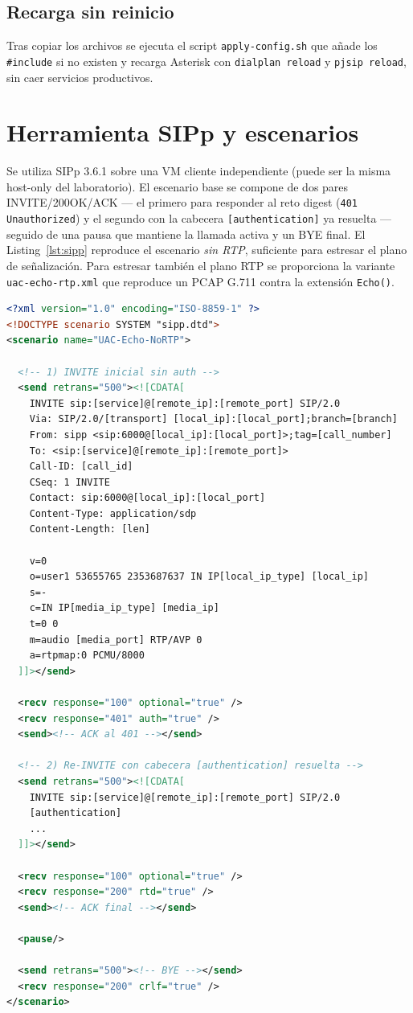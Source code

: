 \documentclass[conference]{IEEEtran}
\begin{document}
\subsection{Recarga sin reinicio}

Tras copiar los archivos se ejecuta el script
\texttt{apply-config.sh} que a\~nade los \texttt{\#include} si no
existen y recarga Asterisk con \texttt{dialplan reload} y
\texttt{pjsip reload}, sin caer servicios productivos.

\section{Herramienta SIPp y escenarios}

Se utiliza SIPp 3.6.1 \cite{ref_sipp} sobre una VM cliente
independiente (puede ser la misma host-only del laboratorio). El
escenario base se compone de dos pares INVITE/200OK/ACK --- el primero
para responder al reto digest (\texttt{401 Unauthorized}) y el segundo
con la cabecera \texttt{[authentication]} ya resuelta --- seguido de
una pausa que mantiene la llamada activa y un BYE final. El
Listing~\ref{lst:sipp} reproduce el escenario \textit{sin RTP},
suficiente para estresar el plano de se\~nalizaci\'on. Para estresar
tambi\'en el plano RTP se proporciona la variante
\texttt{uac-echo-rtp.xml} que reproduce un PCAP G.711 contra la
extensi\'on \texttt{Echo()}.

\begin{lstlisting}[language=XML,caption={\texttt{uac-echo-no-rtp.xml}: escenario UAC con digest (esqueleto).},label=lst:sipp]
<?xml version="1.0" encoding="ISO-8859-1" ?>
<!DOCTYPE scenario SYSTEM "sipp.dtd">
<scenario name="UAC-Echo-NoRTP">

  <!-- 1) INVITE inicial sin auth -->
  <send retrans="500"><![CDATA[
    INVITE sip:[service]@[remote_ip]:[remote_port] SIP/2.0
    Via: SIP/2.0/[transport] [local_ip]:[local_port];branch=[branch]
    From: sipp <sip:6000@[local_ip]:[local_port]>;tag=[call_number]
    To: <sip:[service]@[remote_ip]:[remote_port]>
    Call-ID: [call_id]
    CSeq: 1 INVITE
    Contact: sip:6000@[local_ip]:[local_port]
    Content-Type: application/sdp
    Content-Length: [len]

    v=0
    o=user1 53655765 2353687637 IN IP[local_ip_type] [local_ip]
    s=-
    c=IN IP[media_ip_type] [media_ip]
    t=0 0
    m=audio [media_port] RTP/AVP 0
    a=rtpmap:0 PCMU/8000
  ]]></send>

  <recv response="100" optional="true" />
  <recv response="401" auth="true" />
  <send><!-- ACK al 401 --></send>

  <!-- 2) Re-INVITE con cabecera [authentication] resuelta -->
  <send retrans="500"><![CDATA[
    INVITE sip:[service]@[remote_ip]:[remote_port] SIP/2.0
    [authentication]
    ...
  ]]></send>

  <recv response="100" optional="true" />
  <recv response="200" rtd="true" />
  <send><!-- ACK final --></send>

  <pause/>

  <send retrans="500"><!-- BYE --></send>
  <recv response="200" crlf="true" />
</scenario>
\end{lstlisting}
\end{document}
